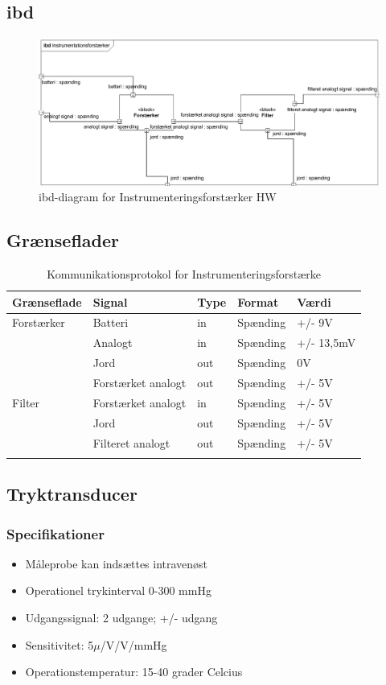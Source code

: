 \subsection{ibd}

\begin{figure}[H]
	\centering
	\includegraphics[width=1\textwidth]{Figurer/Snip20151104_48}
	\caption{ibd-diagram for Instrumenteringsforstærker HW}
	\label{fig:ibdhw-diagram}
\end{figure}

\subsection{Grænseflader}

\begin{longtabu} to 
	\textbf{Grænseflade} & \textbf{Signal} & \textbf{Type} & \textbf{Format} & \textbf{Værdi} \\[-1ex]
	\midrule
	Forstærker & Batteri & in & Spænding & +/- 9V \\[-1ex]
			   & Analogt & in & Spænding & +/- 13,5mV \\[-1ex]
			   & Jord	 & out & Spænding & 0V \\[-1ex]
			   & Forstærket analogt & out & Spænding & +/- 5V \\[-1ex]
	Filter	   & Forstærket analogt & in & Spænding & +/- 5V\\[-1ex]
			   & Jord	 & out & Spænding & +/- 5V\\[-1ex]
			   & Filteret analogt & out & Spænding & +/- 5V\\[-1ex]
	\caption{Kommunikationsprotokol for Instrumenteringsforstærke}	
\end{longtabu}

\subsection{Tryktransducer}
\subsubsection{Specifikationer}
\begin{itemize}
	\item Måleprobe kan indsættes intravenøst
	\item Operationel trykinterval 0-300 mmHg
	\item Udgangssignal: 2 udgange; +/- udgang
	\item Sensitivitet: 5$\mu$/V/V/mmHg 
	\item Operationstemperatur: 15-40 grader Celcius
\end{itemize}

